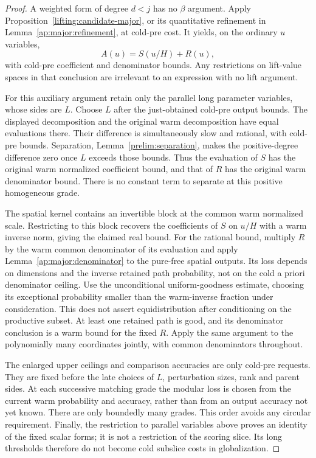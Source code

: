 \begin{proof}
A weighted form of degree $d<j$ has no $\beta$ argument.  Apply
Proposition~\ref{lifting:candidate-major}, or its quantitative
refinement in Lemma~\ref{ap:major:refinement}, at cold-pre cost.
It yields, on the ordinary $u$ variables,
\[
                           A(u)=S(u/H)+R(u),
\]
with cold-pre coefficient and denominator bounds.  Any restrictions
on lift-value spaces in that conclusion are irrelevant to an
expression with no lift argument.

For this auxiliary argument retain only the parallel long parameter
variables, whose sides are $L$.  Choose $L$ after the just-obtained
cold-pre output bounds.  The displayed decomposition and the
original warm decomposition have equal evaluations there.  Their
difference is simultaneously slow and rational, with cold-pre
bounds.  Separation, Lemma~\ref{prelim:separation}, makes the
positive-degree difference zero once $L$ exceeds those bounds.
Thus the evaluation of $S$ has the original warm normalized
coefficient bound, and that of $R$ has the original warm denominator
bound.  There is no constant term to separate at this positive
homogeneous grade.

The spatial kernel contains an invertible block at the common warm
normalized scale.  Restricting to this block recovers the coefficients
of $S$ on $u/H$ with a warm inverse norm, giving the claimed real
bound.  For the rational bound, multiply $R$ by the warm common
denominator of its evaluation and apply
Lemma~\ref{ap:major:denominator} to the pure-free spatial
outputs.  Its loss depends on dimensions and the inverse retained
path probability, not on the cold a priori denominator ceiling.
Use the unconditional uniform-goodness estimate, choosing its
exceptional probability smaller than the warm-inverse fraction
under consideration.  This does not assert equidistribution after
conditioning on the productive subset.  At least one retained path is good,
and its denominator conclusion is a warm bound for the fixed $R$.
Apply the same argument to the polynomially many coordinates
jointly, with common denominators throughout.

The enlarged upper ceilings and comparison accuracies are only
cold-pre requests.  They are fixed before the late choices of $L$,
perturbation sizes, rank and parent sides.  At each successive
matching grade the modular loss is chosen from the current warm
probability and accuracy, rather than from an output accuracy not
yet known.  There are only boundedly many grades.  This order avoids
any circular requirement.  Finally, the restriction to parallel
variables above proves an identity of the fixed scalar forms; it
is not a restriction of the scoring slice.  Its long thresholds
therefore do not become cold subslice costs in globalization.
\end{proof}

